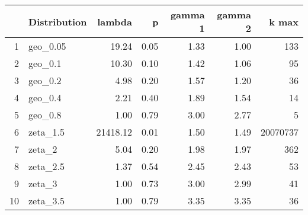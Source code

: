 \begin{table}[ht]
\centering
\begin{tabular}{rlrrrrr}
  \hline
 & Distribution & lambda & p & gamma 1 & gamma 2 & k max \\ 
  \hline
1 & geo\_0.05 & 19.24 & 0.05 & 1.33 & 1.00 & 133 \\ 
  2 & geo\_0.1 & 10.30 & 0.10 & 1.42 & 1.06 &  95 \\ 
  3 & geo\_0.2 & 4.98 & 0.20 & 1.57 & 1.20 &  36 \\ 
  4 & geo\_0.4 & 2.21 & 0.40 & 1.89 & 1.54 &  14 \\ 
  5 & geo\_0.8 & 1.00 & 0.79 & 3.00 & 2.77 &   5 \\ 
  6 & zeta\_1.5 & 21418.12 & 0.01 & 1.50 & 1.49 & 20070737 \\ 
  7 & zeta\_2 & 5.04 & 0.20 & 1.98 & 1.97 & 362 \\ 
  8 & zeta\_2.5 & 1.37 & 0.54 & 2.45 & 2.43 &  53 \\ 
  9 & zeta\_3 & 1.00 & 0.73 & 3.00 & 2.99 &  41 \\ 
  10 & zeta\_3.5 & 1.00 & 0.79 & 3.35 & 3.35 &  36 \\ 
   \hline
\end{tabular}
\end{table}
